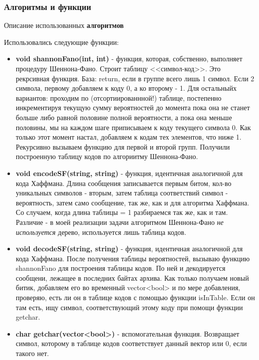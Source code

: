 \documentclass[russian, a4paper, 12pt]{article}
\begin{document}
\subsubsection{Алгоритмы и функции}
Описание использованных \textbf{алгоритмов}

Использовались следующие функции:
\begin{itemize}
  \item \textbf{void shannonFano(int, int)} - функция, которая, собственно, выполняет
  процедуру Шеннона-Фано. Строит таблицу <<символ-код>>. Это рекрсивная функция. База:
  return, если в группе всего лишь 1 символ. Если 2 символа, первому добавляем к коду 0, а
  ко второму - 1. Для остальныйх вариантов: проходим по (отсортиированнной!) таблице, постепенно
  инкрементируя текущую сумму вероятностей до момента пока она не станет больше либо равной половине
  полной вероятности, а пока она меньше половины, мы на каждом шаге приписываем
  к коду текущего символа 0. Как только этот момент настал, добавляем к кодам тех элементов, что ниже 1.
  Рекурсивно вызываем функцию для первой и второй групп. Получили построенную таблицу кодов по алгориитму
  Шеннона-Фано.
  \item \textbf{void encodeSF(string, string)} - функция, идентичная аналогичной для кода Хаффмана.
  Длина сообщения записывается первым битом, кол-во уникальных символов - вторым, затем таблица соответствий
  символ - вероятность, затем само сообщение, так же, как и для алгоритма Хаффмана. Со случаем, когда длина
  таблицы = 1 разбираемся так же, как и там. Различие - в моей реализации задачи алгоритмом Шеннона-Фано
  \textit{не используется} дерево, используется лишь таблица кодов.
  \item \textbf{void decodeSF(string, string)} - функция, идентичная аналогичной для кода Хаффмана.
  После получения таблицы вероятностей, вызываю функцию shannonFano для построения таблицы кодов. По ней
  и декодируется сообщени, лежащее в последних байтах архива. Как только получаем новый битик,
  добавляем его во временный vector<bool> и по мере добавления, проверяю, есть ли он в таблице кодов
  с помощью функции isInTable. Если он там есть, ищу символ, соответствующий этому коду при помощи
  функции getchar.
  \item \textbf{char getchar(vector<bool>)} - вспомогательная функция. Возвращает символ, которому
  в таблице кодов соответствует данный вектор или 0, если такого нет.
\end{itemize}
\newpage
\end{document}
